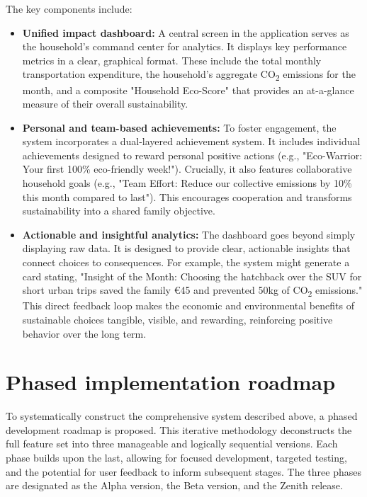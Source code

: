 The key components include:
\begin{itemize}
    \item \textbf{Unified impact dashboard:} A central screen in the application serves as the household's command center for analytics. It displays key performance metrics in a clear, graphical format. These include the total monthly transportation expenditure, the household's aggregate CO\textsubscript{2} emissions for the month, and a composite "Household Eco-Score" that provides an at-a-glance measure of their overall sustainability.
    
    \textgap
    
    \item \textbf{Personal and team-based achievements:} To foster engagement, the system incorporates a dual-layered achievement system. It includes individual achievements designed to reward personal positive actions (e.g., "Eco-Warrior: Your first 100\% eco-friendly week!"). Crucially, it also features collaborative household goals (e.g., "Team Effort: Reduce our collective emissions by 10\% this month compared to last"). This encourages cooperation and transforms sustainability into a shared family objective.
    
    \textgap
    
    \item \textbf{Actionable and insightful analytics:} The dashboard goes beyond simply displaying raw data. It is designed to provide clear, actionable insights that connect choices to consequences. For example, the system might generate a card stating, "Insight of the Month: Choosing the hatchback over the SUV for short urban trips saved the family €45 and prevented 50kg of CO\textsubscript{2} emissions." This direct feedback loop makes the economic and environmental benefits of sustainable choices tangible, visible, and rewarding, reinforcing positive behavior over the long term.
\end{itemize}

\section{Phased implementation roadmap}

To systematically construct the comprehensive system described above, a phased development roadmap is proposed. This iterative methodology deconstructs the full feature set into three manageable and logically sequential versions. Each phase builds upon the last, allowing for focused development, targeted testing, and the potential for user feedback to inform subsequent stages. The three phases are designated as the Alpha version, the Beta version, and the Zenith release.

